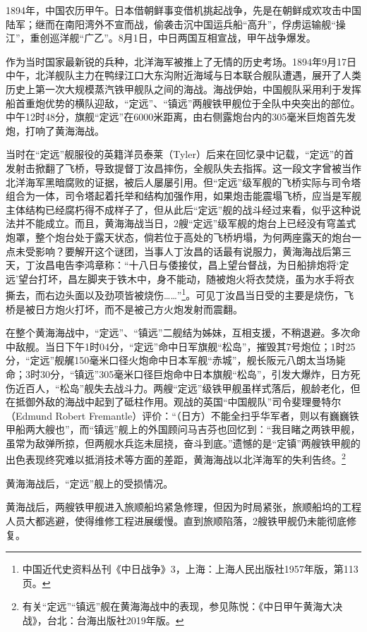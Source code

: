 \documentclass[12pt,UTF8]{ctexbook}
\begin{document}
1894年，中国农历甲午。日本借朝鲜事变借机挑起战争，先是在朝鲜成欢攻击中国陆军；继而在南阳湾外不宣而战，偷袭击沉中国运兵船“高升”，俘虏运输舰“操江”，重创巡洋舰“广乙”。8月1日，中日两国互相宣战，甲午战争爆发。

作为当时国家最新锐的兵种，北洋海军被推上了无情的历史考场。1894年9月17日中午，北洋舰队主力在鸭绿江口大东沟附近海域与日本联合舰队遭遇，展开了人类历史上第一次大规模蒸汽铁甲舰队之间的海战。海战伊始，中国舰队采用利于发挥船首重炮优势的横队迎敌，“定远”、“镇远”两艘铁甲舰位于全队中央突出的部位。中午12时48分，旗舰“定远”在6000米距离，由右侧露炮台内的305毫米巨炮首先发炮，打响了黄海海战。

当时在“定远”舰服役的英籍洋员泰莱（Tyler）后来在回忆录中记载，“定远”的首发射击掀翻了飞桥，导致提督丁汝昌摔伤，全舰队失去指挥。这一段文字曾被当作北洋海军黑暗腐败的证据，被后人屡屡引用。但“定远”级军舰的飞桥实际与司令塔组合为一体，司令塔起着托举和结构加强作用，如果炮击能震塌飞桥，应当是军舰主体结构已经腐朽得不成样子了，但从此后“定远”舰的战斗经过来看，似乎这种说法并不能成立。而且，黄海海战当日，2艘“定远”级军舰的炮台上已经没有穹盖式炮罩，整个炮台处于露天状态，倘若位于高处的飞桥坍塌，为何两座露天的炮台一点未受影响？要解开这个谜团，当事人丁汝昌的话最有说服力，黄海海战后第三天，丁汝昌电告李鸿章称：“十八日与倭接仗，昌上望台督战，为日船排炮将‘定远’望台打坏，昌左脚夹于铁木中，身不能动，随被炮火将衣焚烧，虽为水手将衣撕去，而右边头面以及劲项皆被烧伤……”\footnote{中国近代史资料丛刊《中日战争》3，上海：上海人民出版社1957年版，第113页。}。可见丁汝昌当日受的主要是烧伤，飞桥是被日方炮火打坏，而不是被己方火炮发射而震翻。

在整个黄海海战中，“定远”、“镇远”二舰结为姊妹，互相支援，不稍退避。多次命中敌舰。当日下午1时04分，“定远”命中日军旗舰“松岛”，摧毁其7号炮位；1时25分，“定远”舰艉150毫米口径火炮命中日本军舰“赤城”，舰长阪元八朗太当场毙命；3时30分，“镇远”305毫米口径巨炮命中日本旗舰“松岛”，引发大爆炸，日方死伤近百人，“松岛”舰失去战斗力。两艘“定远”级铁甲舰虽样式落后，舰龄老化，但在抵御外敌的海战中起到了砥柱作用。观战的英国“中国舰队”司令斐理曼特尔（Edmund Robert Fremantle）评价：“（日方）不能全扫乎华军者，则以有巍巍铁甲船两大艘也”，而“镇远”舰上的外国顾问马吉芬也回忆到：“我目睹之两铁甲舰，虽常为敌弹所掠，但两舰水兵迄未屈挠，奋斗到底。”遗憾的是“定镇”两艘铁甲舰的出色表现终究难以抵消技术等方面的差距，黄海海战以北洋海军的失利告终。\footnote{有关“定远”“镇远”舰在黄海海战中的表现，参见陈悦：《中日甲午黄海大决战》，台北：台海出版社2019年版。}

黄海海战后，“定远”舰上的受损情况。

黄海战后，两艘铁甲舰进入旅顺船坞紧急修理，但因为时局紧张，旅顺船坞的工程人员大都逃避，使得维修工程进展缓慢。直到旅顺陷落，2艘铁甲舰仍未能彻底修复。
\end{document}
